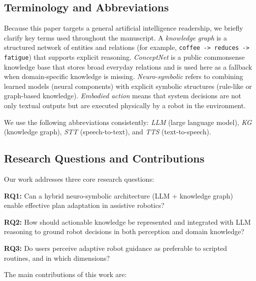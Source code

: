 \subsection{Terminology and Abbreviations}

Because this paper targets a general artificial intelligence readership, we briefly clarify key terms used throughout the manuscript. A \textit{knowledge graph} is a structured network of entities and relations (for example, \texttt{coffee -> reduces -> fatigue}) that supports explicit reasoning. \textit{ConceptNet} is a public commonsense knowledge base that stores broad everyday relations and is used here as a fallback when domain-specific knowledge is missing. \textit{Neuro-symbolic} refers to combining learned models (neural components) with explicit symbolic structures (rule-like or graph-based knowledge). \textit{Embodied action} means that system decisions are not only textual outputs but are executed physically by a robot in the environment.

We use the following abbreviations consistently: \textit{LLM} (large language model), \textit{KG} (knowledge graph), \textit{STT} (speech-to-text), and \textit{TTS} (text-to-speech).

\subsection{Research Questions and Contributions}

Our work addresses three core research questions:

\textbf{RQ1:} Can a hybrid neuro-symbolic architecture (LLM + knowledge graph) enable effective plan adaptation in assistive robotics?

\textbf{RQ2:} How should actionable knowledge be represented and integrated with LLM reasoning to ground robot decisions in both perception and domain knowledge?

\textbf{RQ3:} Do users perceive adaptive robot guidance as preferable to scripted routines, and in which dimensions?

The main contributions of this work are:

